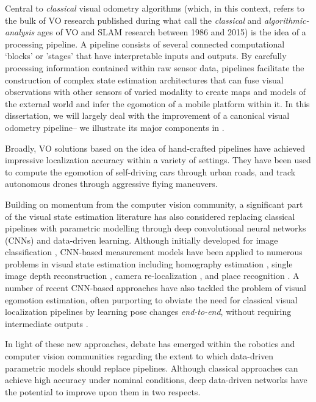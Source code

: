 Central to \textit{classical} visual odometry algorithms (which, in this context, refers to the bulk of VO research published during what \cite{Cadena2016-ds} call the \textit{classical} and \textit{algorithmic-analysis} ages of VO and SLAM research between 1986 and 2015) is the idea of a processing pipeline. A  pipeline consists of several connected computational `blocks' or 'stages' that have interpretable inputs and outputs.  By carefully processing information contained within raw sensor data, pipelines facilitate the construction of complex state estimation architectures that can fuse visual observations with other sensors of varied modality to create maps and models of the external world and infer the egomotion of a mobile platform within it. In this dissertation, we will largely deal with the improvement of a canonical visual odometry pipeline-- we illustrate its major components in . 

Broadly, VO solutions based on the idea of hand-crafted pipelines \citep{Leutenegger2015-fk, Cvisic2015-mt, Tsotsos2015, Alcantarilla2016-kv, forster2014svo, wang_stereo_2017, engel_direct_2018} have achieved impressive localization accuracy within a variety of settings. They have been used to compute the egomotion of self-driving cars through urban roads, and track autonomous drones through aggressive flying maneuvers. 

Building on momentum from the computer vision community, a significant part of the visual state estimation literature has also considered replacing classical pipelines with parametric modelling through deep convolutional neural networks (CNNs) and data-driven learning. Although initially developed for image classification \citep{LeCun2015-qf}, CNN-based measurement models have been applied to numerous problems in visual state estimation including homography estimation \citep{DeTone2016-ue}, single image depth reconstruction \citep{Garg2016-ip},  camera re-localization \citep{Kendall2016-zf}, and place recognition \citep{Sunderhauf2015-is}. A number of recent CNN-based approaches have also tackled the problem of visual egomotion estimation, often purporting to obviate the need for classical visual localization pipelines by learning pose changes \textit{end-to-end}, without requiring intermediate outputs \citep{Melekhov2017-dl, Handa2016-hm, Oliveira2017-lt}.

In light of these new approaches, debate has emerged within the robotics and computer vision communities regarding the extent to which data-driven parametric models should replace pipelines. Although classical approaches can achieve high accuracy under nominal conditions, deep data-driven networks have the potential to improve upon them in two respects.

